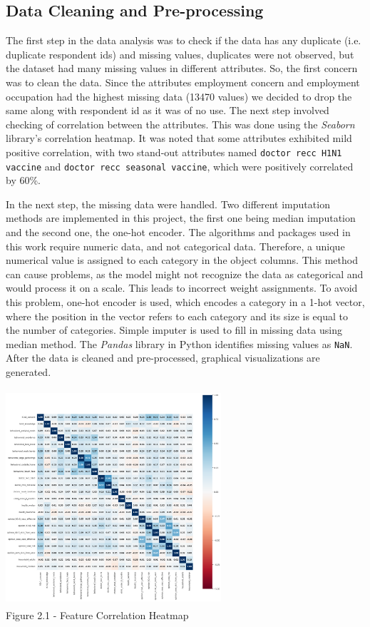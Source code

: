 \documentclass{IEEEtran}
\begin{document}
\subsection{Data Cleaning and Pre-processing}
The first step in the data analysis was to check if the data has any duplicate (i.e. duplicate respondent ids) and missing values, duplicates were not observed, but the dataset had many missing values in different attributes. So, the first concern was to clean the data. Since the attributes employment concern and employment occupation had the highest missing data (13470 values) we decided to drop the same along with respondent id as it was of no use. The next step involved checking of correlation  between the attributes. This was done using the \textit{Seaborn} library's correlation heatmap. It was noted that some attributes exhibited mild positive correlation, with two stand-out attributes named \texttt{doctor recc H1N1 vaccine} and \texttt{doctor recc seasonal vaccine}, which were positively correlated by 60\%.

In the next step, the missing data were handled. Two different imputation methods are implemented in this project, the first one being median imputation and the second one, the one-hot encoder. The algorithms and packages used in this work require numeric data, and not categorical data. Therefore, a unique numerical value is assigned to each category in the object columns. This method can cause problems, as the model might not recognize the data as categorical and would process it on a scale. This leads to incorrect weight assignments. To avoid this problem, one-hot encoder is used, which encodes a category in a 1-hot vector, where the position in the vector refers to each category and its size is equal to the number of categories. Simple imputer is used to fill in missing data using median method. The \textit{Pandas} library in Python identifies missing values as \texttt{NaN}. After the data is cleaned and pre-processed, graphical visualizations are generated.
\begin{center}
    \includegraphics[width = 8cm,height=8cm]{figures/Heatmap.png}\\  
    Figure 2.1 - Feature Correlation Heatmap
\end{center}
\end{document}
